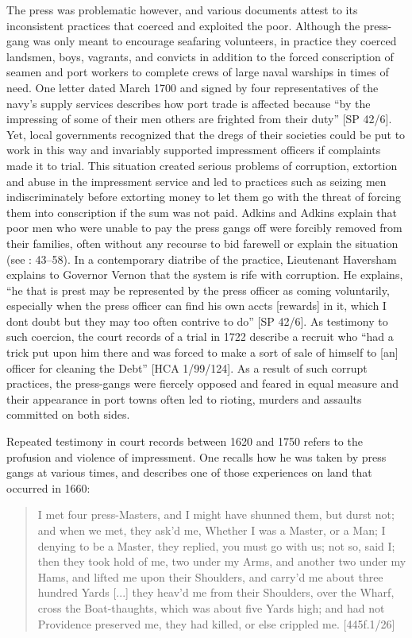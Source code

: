 The press was problematic however, and various documents attest to its inconsistent practices that coerced and exploited the poor. Although the press-gang was only meant to encourage seafaring volunteers, in practice they coerced landsmen, boys, vagrants, and convicts in addition to the forced conscription of seamen and port workers to complete crews of large naval warships in times of need. One letter dated March {1700} and signed by four representatives of the navy’s supply services describes how port trade is affected because “by the impressing of some of their men others are frighted from their duty” [SP 42/6]. Yet, local governments recognized that the dregs of their societies could be put to work in this way and invariably supported impressment officers if complaints made it to trial. This situation created serious problems of corruption, extortion and abuse in the impressment service and led to practices such as seizing men indiscriminately before extorting money to let them go with the threat of forcing them into conscription if the sum was not paid. Adkins and Adkins explain that poor men who were unable to pay the press gangs off were forcibly removed from their families, often without any recourse to bid farewell or explain the situation (see \citealt{AdkinsAdkins2008}: 43–58). In a contemporary diatribe of the practice, Lieutenant Haversham explains to Governor Vernon that the system is rife with corruption. He explains, “he that is prest may be represented by the press officer as coming voluntarily, especially when the press officer can find his own accts [rewards] in it, which I dont doubt but they may too often contrive to do” [SP 42/6]. As testimony to such coercion, the court records of a trial in 1722 describe a recruit who “had a trick put upon him there and was forced to make a sort of sale of himself to [an] officer for cleaning the Debt” [HCA 1/99/124]. As a result of such corrupt practices, the press-gangs were fiercely opposed and feared in equal measure and their appearance in port towns often led to rioting, murders and assaults committed on both sides. 

Repeated testimony in court records between 1620 and 1750 refers to the profusion and violence of impressment. One  recalls how he was taken by press gangs at various times, and describes one of those experiences on land that occurred in 1660:

\begin{quotation}
I met four press-Masters, and I might have shunned them, but durst not; and when we met, they ask’d me, Whether I was a Master, or a Man; I denying to be a Master, they replied, you must go with us; not so, said I; then they took hold of me, two under my Arms, and another two under my Hams, and lifted me upon their Shoulders, and carry’d me about three hundred Yards [...] they heav’d me from their Shoulders, over the Wharf, cross the Boat-thaughts, which was about five Yards high; and had not Providence preserved me, they had killed, or else crippled me. [445f.1/26]\end{quotation}

